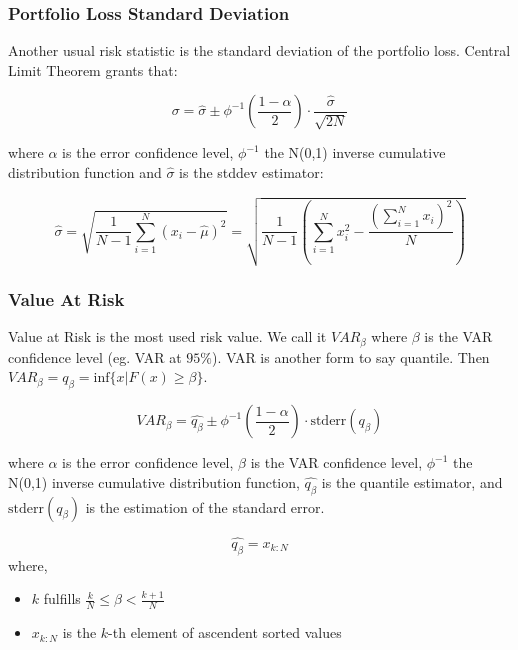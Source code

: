 \documentclass[a4paper,12pt,final]{article}
\begin{document}
\subsubsection{Portfolio Loss Standard Deviation}
Another usual risk statistic is the standard deviation of the portfolio loss.
Central Limit Theorem \cite{stats:schaum} grants that:

\begin{displaymath}
\sigma = \widehat{\sigma} \pm \phi^{-1}\left(\frac{1-\alpha}{2}\right) \cdot \frac{\widehat{\sigma}}{\sqrt{2N}}
\end{displaymath}

where $\alpha$ is the error confidence level, $\phi^{-1}$ the N(0,1) inverse 
cumulative distribution function and $\widehat{\sigma}$ is the stddev estimator:

\begin{displaymath}
\widehat{\sigma} =
\sqrt{\frac{1}{N-1} \sum_{i=1}^{N} \left( x_i - \widehat{\mu} \right)^2} =
\sqrt{\frac{1}{N-1} \left( \sum_{i=1}^{N} x_i^2 - \frac{\left(\sum_{i=1}^{N} x_i \right)^2}{N} \right)}
\end{displaymath}

\subsubsection{Value At Risk}
Value at Risk \cite{var:jorion} is the most used risk value. We call it 
$VAR_{\beta}$ where $\beta$ is the VAR confidence level (eg. VAR at $95\%$).
VAR is another form to say quantile. Then
$VAR_{\beta} = q_{\beta} = \textrm{inf}\{x | F(x) \geq \beta \}$. 

\begin{displaymath}
VAR_{\beta} = \widehat{q_{\beta}} \pm \phi^{-1}\left(\frac{1-\alpha}{2}\right) \cdot \textrm{stderr}(q_{\beta})
\end{displaymath}

where $\alpha$ is the error confidence level, $\beta$ is the VAR confidence 
level, $\phi^{-1}$ the N(0,1) inverse cumulative distribution function, 
$\widehat{q_{\beta}}$ is the quantile estimator, and $\textrm{stderr}(q_{\beta})$
is the estimation of the standard error.

\begin{displaymath}
\widehat{q_{\beta}} = x_{k:N}
\end{displaymath}
where,
\begin{itemize}
\item $k$ fulfills $\frac{k}{N} \leq \beta < \frac{k+1}{N}$
\item $x_{k:N}$ is the $k$-th element of ascendent sorted values
\end{itemize}
\end{document}
